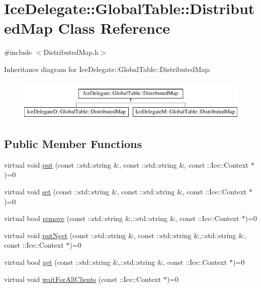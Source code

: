 \hypertarget{class_ice_delegate_1_1_global_table_1_1_distributed_map}{
\section{IceDelegate::GlobalTable::DistributedMap Class Reference}
\label{class_ice_delegate_1_1_global_table_1_1_distributed_map}
}


{\ttfamily \#include $<$DistributedMap.h$>$}

Inheritance diagram for IceDelegate::GlobalTable::DistributedMap:\begin{figure}[H]
\begin{center}
\leavevmode
\includegraphics[height=2cm]{class_ice_delegate_1_1_global_table_1_1_distributed_map}
\end{center}
\end{figure}
\subsection*{Public Member Functions}
\begin{DoxyCompactItemize}
\item 
virtual void \hyperlink{class_ice_delegate_1_1_global_table_1_1_distributed_map_a145c6fd07b6d19f68f28414f0ae972f5}{put} (const ::std::string \&, const ::std::string \&, const ::Ice::Context $\ast$)=0
\item 
virtual void \hyperlink{class_ice_delegate_1_1_global_table_1_1_distributed_map_ab61ffb89d4f5e7aed0c9ef26db2cf08c}{set} (const ::std::string \&, const ::std::string \&, const ::Ice::Context $\ast$)=0
\item 
virtual bool \hyperlink{class_ice_delegate_1_1_global_table_1_1_distributed_map_aa0616738a0cfb246e9e9921629c8dbd3}{remove} (const ::std::string \&,::std::string \&, const ::Ice::Context $\ast$)=0
\item 
virtual void \hyperlink{class_ice_delegate_1_1_global_table_1_1_distributed_map_a41847e7af4589564ef39469d2628a09c}{putNget} (const ::std::string \&, const ::std::string \&,::std::string \&, const ::Ice::Context $\ast$)=0
\item 
virtual bool \hyperlink{class_ice_delegate_1_1_global_table_1_1_distributed_map_a024ac1e825e6c918e191bcf737b0a190}{get} (const ::std::string \&,::std::string \&, const ::Ice::Context $\ast$)=0
\item 
virtual void \hyperlink{class_ice_delegate_1_1_global_table_1_1_distributed_map_ad589c12e7d1d78e40769d30fc9d485c9}{waitForAllClients} (const ::Ice::Context $\ast$)=0
\end{DoxyCompactItemize}


